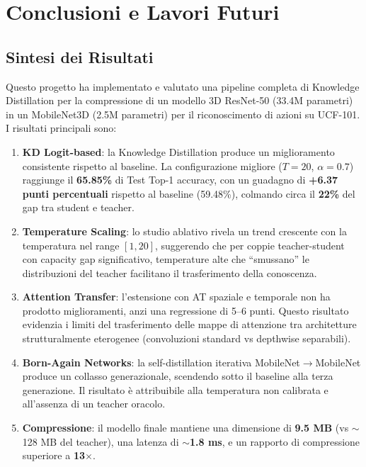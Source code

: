 \chapter{Conclusioni e Lavori Futuri}
\label{chap:conclusioni}

\section{Sintesi dei Risultati}

Questo progetto ha implementato e valutato una pipeline completa di Knowledge Distillation per la compressione di un modello 3D ResNet-50 (33.4M parametri) in un MobileNet3D (2.5M parametri) per il riconoscimento di azioni su UCF-101. I risultati principali sono:

\begin{enumerate}
    \item \textbf{KD Logit-based}: la Knowledge Distillation produce un miglioramento consistente rispetto al baseline. La configurazione migliore ($T=20$, $\alpha=0.7$) raggiunge il \textbf{65.85\%} di Test Top-1 accuracy, con un guadagno di \textbf{+6.37 punti percentuali} rispetto al baseline (59.48\%), colmando circa il \textbf{22\%} del gap tra student e teacher.
    
    \item \textbf{Temperature Scaling}: lo studio ablativo rivela un trend crescente con la temperatura nel range $[1, 20]$, suggerendo che per coppie teacher-student con capacity gap significativo, temperature alte che ``smussano'' le distribuzioni del teacher facilitano il trasferimento della conoscenza.
    
    \item \textbf{Attention Transfer}: l'estensione con AT spaziale e temporale non ha prodotto miglioramenti, anzi una regressione di 5--6 punti. Questo risultato evidenzia i limiti del trasferimento delle mappe di attenzione tra architetture strutturalmente eterogenee (convoluzioni standard vs depthwise separabili).
    
    \item \textbf{Born-Again Networks}: la self-distillation iterativa MobileNet$\rightarrow$MobileNet produce un collasso generazionale, scendendo sotto il baseline alla terza generazione. Il risultato è attribuibile alla temperatura non calibrata e all'assenza di un teacher oracolo.
    
    \item \textbf{Compressione}: il modello finale mantiene una dimensione di \textbf{9.5 MB} (vs $\sim$128 MB del teacher), una latenza di \textbf{$\sim$1.8 ms}, e un rapporto di compressione superiore a \textbf{13$\times$}.
\end{enumerate}

